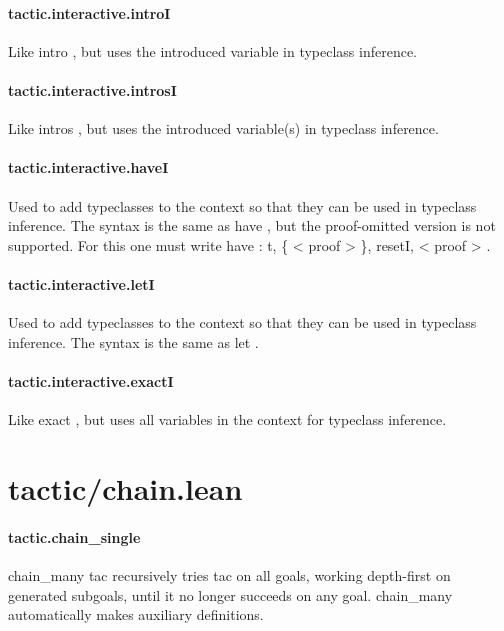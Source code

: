 \documentclass{article}
\begin{document}
\paragraph{tactic.interactive.introI}
\par
Like 
\colorbox[RGB]{253,246,227}{{{{\color[RGB]{101, 123, 131} intro }}}}, but uses the introduced variable
in typeclass inference.
\paragraph{tactic.interactive.introsI}
\par
Like 
\colorbox[RGB]{253,246,227}{{{{\color[RGB]{101, 123, 131} intros }}}}, but uses the introduced variable(s)
in typeclass inference.
\paragraph{tactic.interactive.haveI}
\par
Used to add typeclasses to the context so that they can
be used in typeclass inference. The syntax is the same as 
\colorbox[RGB]{253,246,227}{{{{\color[RGB]{133, 153, 0} have }}}},
but the proof-omitted version is not supported. For
this one must write 
\colorbox[RGB]{253,246,227}{{{{\color[RGB]{133, 153, 0} have }}}{{{\color[RGB]{101, 123, 131}  : t, \{  }}}{{{\color[RGB]{181, 137, 0} < }}}{{{\color[RGB]{101, 123, 131} proof }}}{{{\color[RGB]{181, 137, 0} > }}}{{{\color[RGB]{101, 123, 131}  \}, resetI,  }}}{{{\color[RGB]{181, 137, 0} < }}}{{{\color[RGB]{101, 123, 131} proof }}}{{{\color[RGB]{181, 137, 0} > }}}}.
\paragraph{tactic.interactive.letI}
\par
Used to add typeclasses to the context so that they can
be used in typeclass inference. The syntax is the same as 
\colorbox[RGB]{253,246,227}{{{{\color[RGB]{133, 153, 0} let }}}}.
\paragraph{tactic.interactive.exactI}
\par
Like 
\colorbox[RGB]{253,246,227}{{{{\color[RGB]{101, 123, 131} exact }}}}, but uses all variables in the context
for typeclass inference.
\section{tactic/chain.lean}\paragraph{tactic.chain\_single}
\par
\colorbox[RGB]{253,246,227}{{{{\color[RGB]{101, 123, 131} chain\_many tac }}}} recursively tries 
\colorbox[RGB]{253,246,227}{{{{\color[RGB]{101, 123, 131} tac }}}} on all goals, working depth-first on generated subgoals,
until it no longer succeeds on any goal. 
\colorbox[RGB]{253,246,227}{{{{\color[RGB]{101, 123, 131} chain\_many }}}} automatically makes auxiliary definitions.
\end{document}
